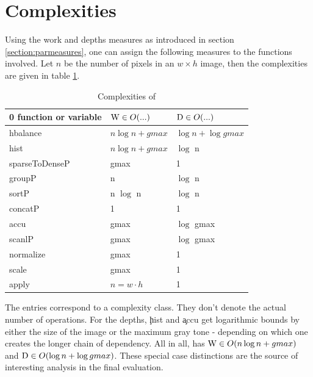 \section{Complexities}
  Using the work and depths measures as introduced in section \ref{section:parmeasures},
  one can assign the following measures to the functions involved.
  Let $n$ be the number of pixels in an $w \times h$ image,
  then the complexities are given in table \ref{complexities:ndpn}.
  \begin{table}[h!]
    \caption{Complexities of \ndpn}
    \label{complexities:ndpn}
    \begin{center}
    \begin{tabular}{lll}
0        \toprule
        function or variable & $\textrm{W} \in O(...)$           & $\textrm{D} \in O(...)$ \\
        \midrule
        hbalance        & $n \log n + gmax$   & $\log n + \log gmax$\\
        \midrule
        hist            & $n \log n + gmax$    & $\log$ n \\
        sparseToDenseP  & gmax                 & 1 \\
        groupP          & n                    & $\log$ n \\
        sortP           & n $\log$ n             & $\log$ n \\
        concatP         & 1                    & 1 \\
        \midrule
        accu            & gmax                 & $\log$ gmax \\
        scanlP          & gmax                 & $\log$ gmax \\
        \midrule
        normalize       & gmax                 & 1 \\
        scale           & gmax                 & 1 \\
        \midrule
        apply           & $n = w \cdot h$ & 1 \\
    \end{tabular}
    \end{center}
  \end{table}
    The entries correspond to a complexity class.
    They don't denote the actual number of operations.
    For the depths, \c{hist} and \c{accu} get logarithmic bounds by
    either the size of the image or the maximum gray tone
    - depending on which one creates the longer chain of dependency.
    All in all, \ndpn has $\textrm{W} \in O(n \log n + gmax)$
    and $\textrm{D} \in O(\log n + \log gmax)$.
    These special case distinctions are the source
    of interesting analysis in the final evaluation.
    
